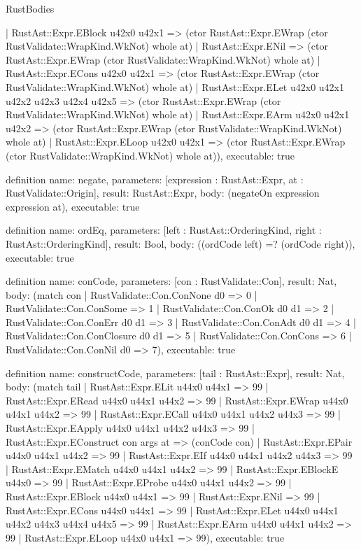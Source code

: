 \begin{lexlean}{RustBodies}
\begin{semanticmodule}
{    | RustAst::Expr.EBlock u42x0 u42x1 => (ctor RustAst::Expr.EWrap (ctor RustValidate::WrapKind.WkNot) whole at)
    | RustAst::Expr.ENil => (ctor RustAst::Expr.EWrap (ctor RustValidate::WrapKind.WkNot) whole at)
    | RustAst::Expr.ECons u42x0 u42x1 => (ctor RustAst::Expr.EWrap (ctor RustValidate::WrapKind.WkNot) whole at)
    | RustAst::Expr.ELet u42x0 u42x1 u42x2 u42x3 u42x4 u42x5 => (ctor RustAst::Expr.EWrap (ctor RustValidate::WrapKind.WkNot) whole at)
    | RustAst::Expr.EArm u42x0 u42x1 u42x2 => (ctor RustAst::Expr.EWrap (ctor RustValidate::WrapKind.WkNot) whole at)
    | RustAst::Expr.ELoop u42x0 u42x1 => (ctor RustAst::Expr.EWrap (ctor RustValidate::WrapKind.WkNot) whole at)),
  executable: true
}

definition{
  name: negate,
  parameters: [expression : RustAst::Expr, at : RustValidate::Origin],
  result: RustAst::Expr,
  body: (negateOn expression expression at),
  executable: true
}

definition{
  name: ordEq,
  parameters: [left : RustAst::OrderingKind, right : RustAst::OrderingKind],
  result: Bool,
  body: ((ordCode left) =? (ordCode right)),
  executable: true
}

definition{
  name: conCode,
  parameters: [con : RustValidate::Con],
  result: Nat,
  body: (match con
    | RustValidate::Con.ConNone d0 => 0
    | RustValidate::Con.ConSome => 1
    | RustValidate::Con.ConOk d0 d1 => 2
    | RustValidate::Con.ConErr d0 d1 => 3
    | RustValidate::Con.ConAdt d0 d1 => 4
    | RustValidate::Con.ConClosure d0 d1 => 5
    | RustValidate::Con.ConCons => 6
    | RustValidate::Con.ConNil d0 => 7),
  executable: true
}

definition{
  name: constructCode,
  parameters: [tail : RustAst::Expr],
  result: Nat,
  body: (match tail
    | RustAst::Expr.ELit u44x0 u44x1 => 99
    | RustAst::Expr.ERead u44x0 u44x1 u44x2 => 99
    | RustAst::Expr.EWrap u44x0 u44x1 u44x2 => 99
    | RustAst::Expr.ECall u44x0 u44x1 u44x2 u44x3 => 99
    | RustAst::Expr.EApply u44x0 u44x1 u44x2 u44x3 => 99
    | RustAst::Expr.EConstruct con args at => (conCode con)
    | RustAst::Expr.EPair u44x0 u44x1 u44x2 => 99
    | RustAst::Expr.EIf u44x0 u44x1 u44x2 u44x3 => 99
    | RustAst::Expr.EMatch u44x0 u44x1 u44x2 => 99
    | RustAst::Expr.EBlockE u44x0 => 99
    | RustAst::Expr.EProbe u44x0 u44x1 u44x2 => 99
    | RustAst::Expr.EBlock u44x0 u44x1 => 99
    | RustAst::Expr.ENil => 99
    | RustAst::Expr.ECons u44x0 u44x1 => 99
    | RustAst::Expr.ELet u44x0 u44x1 u44x2 u44x3 u44x4 u44x5 => 99
    | RustAst::Expr.EArm u44x0 u44x1 u44x2 => 99
    | RustAst::Expr.ELoop u44x0 u44x1 => 99),
  executable: true
}


\end{semanticmodule}
\end{lexlean}
